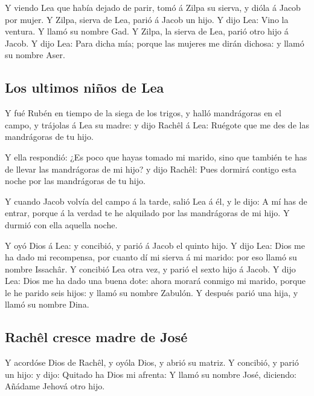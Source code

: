  Y viendo Lea que había dejado de parir, tomó á Zilpa su
sierva, y dióla á Jacob por mujer.  Y Zilpa, sierva de
Lea, parió á Jacob un hijo.  Y dijo Lea: Vino la ventura.
Y llamó su nombre Gad.  Y Zilpa, la sierva de Lea, parió
otro hijo á Jacob.  Y dijo Lea: Para dicha mía; porque
las mujeres me dirán dichosa: y llamó su nombre Aser.

\hypertarget{los-ultimos-niuxf1os-de-lea}{%
\subsection{Los ultimos niños de
Lea}\label{los-ultimos-niuxf1os-de-lea}}

 Y fué Rubén en tiempo de la siega de los trigos, y halló
mandrágoras en el campo, y trájolas á Lea su madre: y dijo Rachêl á Lea:
Ruégote que me des de las mandrágoras de tu hijo.

 Y ella respondió: ¿Es poco que hayas tomado mi marido,
sino que también te has de llevar las mandrágoras de mi hijo? y dijo
Rachêl: Pues dormirá contigo esta noche por las mandrágoras de tu hijo.

 Y cuando Jacob volvía del campo á la tarde, salió Lea á
él, y le dijo: A mí has de entrar, porque á la verdad te he alquilado
por las mandrágoras de mi hijo. Y durmió con ella aquella noche.

 Y oyó Dios á Lea: y concibió, y parió á Jacob el quinto
hijo.  Y dijo Lea: Dios me ha dado mi recompensa, por
cuanto dí mi sierva á mi marido: por eso llamó su nombre Issachâr.
 Y concibió Lea otra vez, y parió el sexto hijo á Jacob.
 Y dijo Lea: Dios me ha dado una buena dote: ahora morará
conmigo mi marido, porque le he parido seis hijos: y llamó su nombre
Zabulón.  Y después parió una hija, y llamó su nombre
Dina.

\hypertarget{rachuxeal-cresce-madre-de-josuxe9}{%
\subsection{Rachêl cresce madre de
José}\label{rachuxeal-cresce-madre-de-josuxe9}}

 Y acordóse Dios de Rachêl, y oyóla Dios, y abrió su
matriz.  Y concibió, y parió un hijo: y dijo: Quitado ha
Dios mi afrenta:  Y llamó su nombre José, diciendo:
Añádame Jehová otro hijo.

